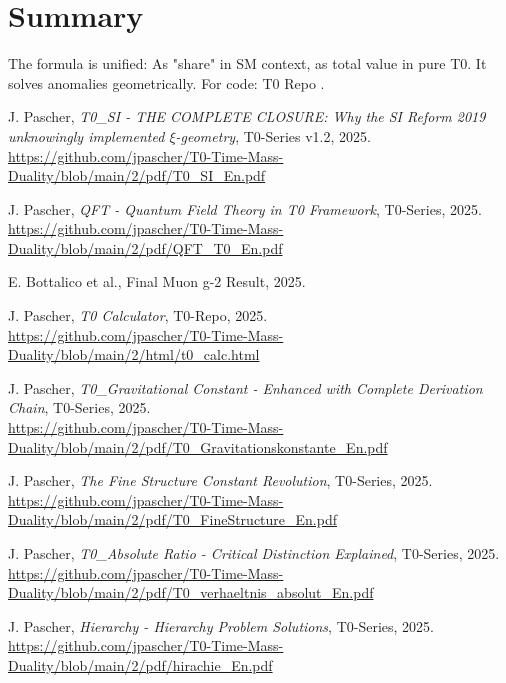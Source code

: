 \documentclass[12pt,a4paper]{article}
\begin{document}
	\section{Summary}
	The formula is unified: As "share" in SM context, as total value in pure T0. It solves anomalies geometrically. For code: T0 Repo \cite{T0_Calc}.
	
	
	\begin{thebibliography}{99}
		 J. Pascher, \textit{T0\_SI - THE COMPLETE CLOSURE: Why the SI Reform 2019 unknowingly implemented $\xi$-geometry}, T0-Series v1.2, 2025. \\
		\url{https://github.com/jpascher/T0-Time-Mass-Duality/blob/main/2/pdf/T0_SI_En.pdf}
		
		 J. Pascher, \textit{QFT - Quantum Field Theory in T0 Framework}, T0-Series, 2025. \\
		\url{https://github.com/jpascher/T0-Time-Mass-Duality/blob/main/2/pdf/QFT_T0_En.pdf}
		
		 E. Bottalico et al., Final Muon g-2 Result, 2025.
		
		 J. Pascher, \textit{T0 Calculator}, T0-Repo, 2025. \\
		\url{https://github.com/jpascher/T0-Time-Mass-Duality/blob/main/2/html/t0_calc.html}
		
		 J. Pascher, \textit{T0\_Gravitational Constant - Enhanced with Complete Derivation Chain}, T0-Series, 2025. \\
		\url{https://github.com/jpascher/T0-Time-Mass-Duality/blob/main/2/pdf/T0_Gravitationskonstante_En.pdf}
		
		 J. Pascher, \textit{The Fine Structure Constant Revolution}, T0-Series, 2025. \\
		\url{https://github.com/jpascher/T0-Time-Mass-Duality/blob/main/2/pdf/T0_FineStructure_En.pdf}
		
		 J. Pascher, \textit{T0\_Absolute Ratio - Critical Distinction Explained}, T0-Series, 2025. \\
		\url{https://github.com/jpascher/T0-Time-Mass-Duality/blob/main/2/pdf/T0_verhaeltnis_absolut_En.pdf}
		
		 J. Pascher, \textit{Hierarchy - Hierarchy Problem Solutions}, T0-Series, 2025. \\
		\url{https://github.com/jpascher/T0-Time-Mass-Duality/blob/main/2/pdf/hirachie_En.pdf}
		

\end{thebibliography}
\end{document}

